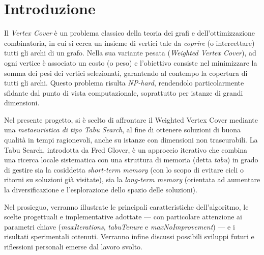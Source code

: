 \section{Introduzione}

Il \emph{Vertex Cover} è un problema classico della teoria dei grafi e dell’ottimizzazione combinatoria, in cui si cerca un insieme di vertici tale da \emph{coprire} (o intercettare) tutti gli archi di un grafo. Nella sua variante pesata (\emph{Weighted Vertex Cover}), ad ogni vertice è associato un costo (o peso) e l’obiettivo consiste nel minimizzare la somma dei pesi dei vertici selezionati, garantendo al contempo la copertura di tutti gli archi. Questo problema risulta \emph{NP-hard}, rendendolo particolarmente sfidante dal punto di vista computazionale, soprattutto per istanze di grandi dimensioni.

Nel presente progetto, si è scelto di affrontare il Weighted Vertex Cover mediante una \emph{metaeuristica di tipo Tabu Search}, al fine di ottenere soluzioni di buona qualità in tempi ragionevoli, anche su istanze con dimensioni non trascurabili. La Tabu Search, introdotta da Fred Glover, è un approccio iterativo che combina una ricerca locale sistematica con una struttura di memoria (detta \emph{tabu}) in grado di gestire sia la cosiddetta \emph{short-term memory} (con lo scopo di evitare cicli o ritorni su soluzioni già visitate), sia la \emph{long-term memory} (orientata ad aumentare la diversificazione e l’esplorazione dello spazio delle soluzioni).

Nel prosieguo, verranno illustrate le principali caratteristiche dell’algoritmo, le scelte progettuali e implementative adottate --- con particolare attenzione ai parametri chiave (\emph{maxIterations}, \emph{tabuTenure} e \emph{maxNoImprovement}) --- e i risultati sperimentali ottenuti. Verranno infine discussi possibili sviluppi futuri e riflessioni personali emerse dal lavoro svolto.

